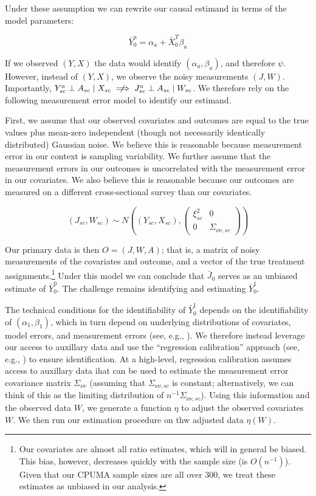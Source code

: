 \documentclass[aoas]{imsart}
\theoremstyle{plain}
\theoremstyle{remark}
\begin{document}
Under these assumption we can rewrite our causal estimand in terms of the model parameters:

\begin{equation}\label{eqn:outcome}
\bar{Y}_0^a = \alpha_a + \bar{X}_0^T\beta_a    
\end{equation}

If we observed $(Y, X)$ the data would identify $(\alpha_a, \beta_a)$, and therefore $\psi$. However, instead of $(Y, X)$, we observe the noisy measurements $(J, W)$. Importantly, $Y_{sc}^a \perp A_{sc} \mid X_{sc} \centernot\implies J_{sc}^a \perp A_{sc} \mid W_{sc}$. We therefore rely on the following measurement error model to identify our estimand.

First, we assume that our observed covariates and outcomes are equal to the true values plus mean-zero independent (though not necessarily identically distributed) Gaussian noise. We believe this is reasonable because measurement error in our context is sampling variability. We further assume that the measurement errors in our outcomes is uncorrelated with the measurement error in our covariates. We also believe this is reasonable because our outcomes are measured on a different cross-sectional survey than our covariates. 

\begin{equation}\label{eqn:msrmenterror}
(J_{sc}, W_{sc}) \sim N((Y_{sc}, X_{sc}), \begin{pmatrix}
\xi^2_{sc} & 0 \\ 0 & \Sigma_{\nu\nu, sc} \end{pmatrix})
\end{equation}

Our primary data is then $O = (J, W, A)$; that is, a matrix of noisy measurements of the covariates and outcome, and a vector of the true treatment assignments.\footnote{Our covariates are almost all ratio estimates, which will in general be biased. This bias, however, decreases quickly with the sample size (is $O(n^{-1})$). Given that our CPUMA sample sizes are all over 300, we treat these estimates as unbiased in our analysis.} Under this model we can conclude that $\bar{J}_0$ serves as an unbiased estimate of $\bar{Y}_0^0$. The challenge remains identifying and estimating $\bar{Y}_0^1$.

The technical conditions for the identifiability of $\bar{Y}_0^1$ depends on the identifiability of $(\alpha_1, \beta_1)$, which in turn depend on underlying distributions of covariates, model errors, and measurement errors (see, e.g., \cite{cheng1999statistical}). We therefore instead leverage our access to auxillary data and use the ``regression calibration'' approach (see, e.g., \cite{carroll2006measurement}) to ensure identification. At a high-level, regression calibration assumes access to auxillary data ihat can be used to estimate the measurement error covariance matrix $\Sigma_{\nu\nu}$ (assuming that $\Sigma_{\nu\nu, sc}$ is constant; alternatively, we can think of this as the limiting distribution of $n^{-1}\Sigma_{\nu\nu, sc}$). Using this information and the observed data $W$, we generate a function $\eta$ to adjust the observed covariates $W$. We then run our estimation procedure on thw adjusted data $\eta(W)$. 
\end{document}

